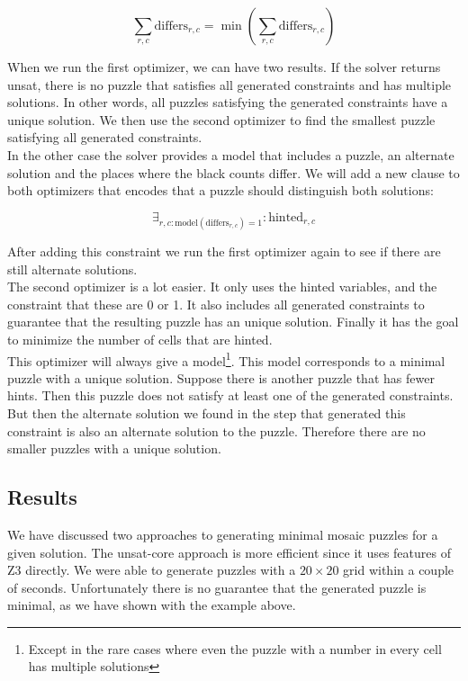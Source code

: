 \documentclass{scrartcl}
\begin{document}
	$$\sum_{r,c}\text{differs}_{r,c} = \min_{}(\sum_{r,c}\text{differs}_{r,c}
	)$$

	When we run the first optimizer, we can have two results.
	If the solver returns unsat, there is no puzzle that satisfies all generated constraints and has multiple solutions. In other words, all puzzles satisfying the generated constraints have a unique solution. We then use the second optimizer to find the smallest puzzle satisfying all generated constraints.\\

	In the other case the solver provides a model that includes a puzzle, an alternate solution and the places where the black counts differ. We will add a new clause to both optimizers that encodes that a puzzle should distinguish both solutions:

	$$\exists_{r,c : \text{model}(\text{differs}_{r,c})=1}: \text{hinted}_{r,c}$$

	After adding this constraint we run the first optimizer again to see if there are still alternate solutions.\\

	The second optimizer is a lot easier.
	It only uses the hinted variables, and the constraint that these are 0 or 1.
	It also includes all generated constraints to guarantee that the resulting puzzle has an unique solution.
	Finally it has the goal to minimize the number of cells that are hinted.\\

	This optimizer will always give a model\footnote{Except in the rare cases where even the puzzle with a number in every cell has multiple solutions}.
	This model corresponds to a minimal puzzle with a unique solution. Suppose there is another puzzle that has fewer hints. Then this puzzle does not satisfy at least one of the generated constraints. But then the alternate solution we found in the step that generated this constraint is also an alternate solution to the puzzle. Therefore there are no smaller puzzles with a unique solution.

	\subsection{Results} %
	\label{sub:results}
	We have discussed two approaches to generating minimal mosaic puzzles for a given solution.
	The unsat-core approach is more efficient since it uses features of Z3 directly. We were able to generate puzzles with a $20\times20$ grid within a couple of seconds. Unfortunately there is no guarantee that the generated puzzle is minimal, as we have shown with the example above.\\
\end{document}
